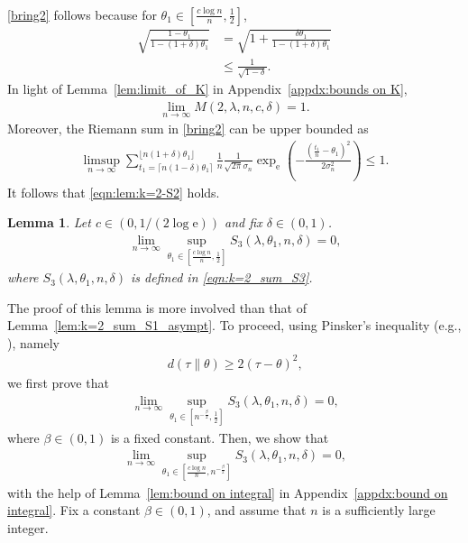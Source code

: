 \documentclass[journal, 10pt]{IEEEtran}
\newcommand{\rme}{\mathrm{e}}
\theoremstyle{plain}
\theoremstyle{plain}
\newtheorem{lem}{Lemma}%
\theoremstyle{plain}
\theoremstyle{plain}
\begin{document}
\begin{appendices}
\begin{IEEEproof}
\begin{align}
\end{align}
\eqref{bring2} follows because for $\theta_1 \in \left[ \frac{c\log n}{n} , \frac{1}{2} \right] $,
\begin{align}
	\sqrt{\frac{1-\theta_1}{1-(1+\delta)\theta_1}}&=\sqrt{1+\frac{\delta\theta_1}{1-(1+\delta)\theta_1} } \\ 
	&\le \frac{1}{\sqrt{1-\delta}}\text{.}
\end{align}
In light of Lemma~\ref{lem:limit_of_K} in Appendix~\ref{appdx:bounds on K},
\begin{align}
\lim_{n\to \infty} M(2, \lambda, n, c, \delta)=1\text{.}
\end{align}
Moreover, the Riemann sum in \eqref{bring2} can be upper bounded as
\begin{align}
\limsup_{n\to \infty }	\sum_{t_1=\lceil n(1-\delta)\theta_1 \rceil }^{\lfloor n(1+\delta)\theta_1 \rfloor} \frac{1}{n} \frac{1}{\sqrt{ 2\pi} \sigma_n } \exp_\rme\left(-\frac{(\frac{t_1}{n}-\theta_1)^2}{2\sigma_n^2}\right) \le 1\text{.}
\end{align}
It follows that \eqref{eqn:lem:k=2-S2} holds.
\end{IEEEproof}
%
\begin{lem}\label{lem:k=2_sum_S3_asympt}
Let $c\in (0, 1/(2\log \rme))$ and fix $\delta \in (0,1)$.
\begin{align}
\lim_{n \to \infty} \sup_{\theta_1\in \left[ \frac{c\log n}{n}, \frac{1}{2} \right]} S_3(\lambda, \theta_1, n, \delta)=0\text{,}
\end{align}
where $S_3(\lambda, \theta_1, n, \delta)$ is defined in \eqref{eqn:k=2_sum_S3}.
\end{lem}
\begin{IEEEproof}
The proof of this lemma is more involved than that of Lemma~\ref{lem:k=2_sum_S1_asympt}. To proceed, using Pinsker's inequality (e.g., \cite[Ex.~3.18]{csiszar-korner81}), namely
\begin{align}
d(\tau\|\theta)\ge 2(\tau-\theta)^2\text{,} \label{eqn:pinsker}
\end{align}
we first prove that 
\begin{align}
\lim_{n \to \infty} \sup_{\theta_1\in \left[ n^{-\frac{\beta}{2}}, \frac{1}{2} \right]} S_3(\lambda, \theta_1, n, \delta)=0\text{,} \label{eqn:proof:k=2-S3-no1}
\end{align}
where $\beta \in (0,1)$ is a fixed constant. Then, we show that
\begin{align}
\lim_{n \to \infty} \sup_{\theta_1\in \left[ \frac{c\log n}{n} , n^{-\frac{\beta}{2}} \right]} S_3(\lambda, \theta_1, n, \delta)=0\text{,} \label{eqn:proof:k=2-S3-no2}
\end{align}
with the help of Lemma~\ref{lem:bound on integral} in Appendix~\ref{appdx:bound on integral}.
Fix a constant $\beta \in (0,1)$, and assume that $n$ is a sufficiently large integer.


\end{IEEEproof}
\end{appendices}
\end{document}
